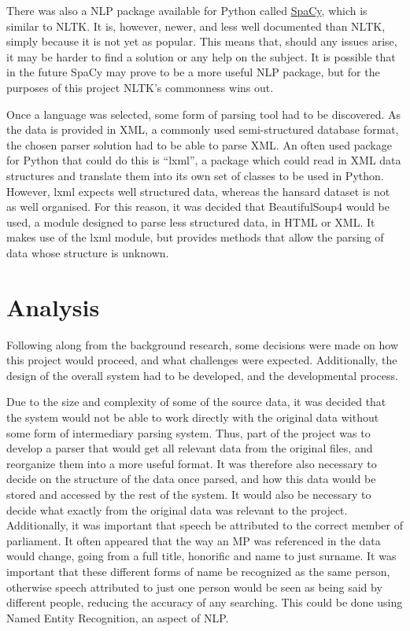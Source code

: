 There was also a NLP package available for Python called \href{spacy.io}{SpaCy}, which is similar to NLTK. It is, however, newer, and less well documented than NLTK, simply because it is not yet as popular. This means that, should any issues arise, it may be harder to find a solution or any help on the subject. It is possible that in the future SpaCy may prove to be a more useful NLP package, but for the purposes of this project NLTK's commonness wins out.

Once a language was selected, some form of parsing tool had to be discovered. As the data is provided in XML, a commonly used semi-structured database format, the chosen parser solution had to be able to parse XML. An often used package for Python that could do this is “lxml”, a package which could read in XML data structures and translate them into its own set of classes to be used in Python. However, lxml expects well structured data, whereas the hansard dataset is not as well organised. For this reason, it was decided that BeautifulSoup4\cite{Richardson} would be used, a module designed to parse less structured data, in HTML or XML. It makes use of the lxml module, but provides methods that allow the parsing of data whose structure is unknown.

\section{Analysis}
\label{sec:bck_analysis}
Following along from the background research, some decisions were made on how this project would proceed, and what challenges were expected. Additionally, the design of the overall system had to be developed, and the developmental process.

Due to the size and complexity of some of the source data, it was decided that the system would not be able to work directly with the original data without some form of intermediary parsing system. Thus, part of the project was to develop a parser that would get all relevant data from the original files, and reorganize them into a more useful format. It was therefore also necessary to decide on the structure of the data once parsed, and how this data would be stored and accessed by the rest of the system. It would also be necessary to decide what exactly from the original data was relevant to the project.
Additionally, it was important that speech be attributed to the correct member of parliament. It often appeared that the way an MP was referenced in the data would change, going from a full title, honorific and name to just surname. It was important that these different forms of name be recognized as the same person, otherwise speech attributed to just one person would be seen as being said by different people, reducing the accuracy of any searching. This could be done using Named Entity Recognition, an aspect of NLP.

